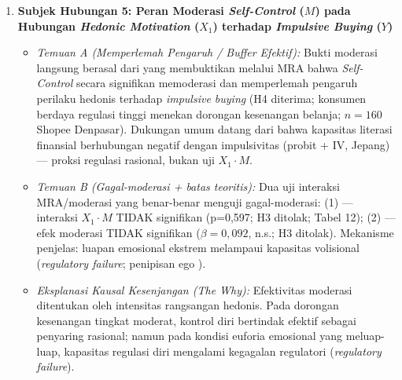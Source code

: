 \documentclass[12pt,a4paper]{article}
\numberwithin{equation}{section}
\numberwithin{table}{section}
\numberwithin{figure}{section}
\begin{document}
\begin{enumerate}
  \item \textbf{Subjek Hubungan 5: Peran Moderasi \emph{Self-Control} ($M$) pada Hubungan \emph{Hedonic Motivation} ($X_1$) terhadap \emph{Impulsive Buying} ($Y$)}
  \begin{itemize}
    \item \emph{Temuan A (Memperlemah Pengaruh / Buffer Efektif):} Bukti moderasi langsung berasal dari \citet{lienardy2026role} yang membuktikan melalui MRA bahwa \emph{Self-Control} secara signifikan memoderasi dan memperlemah pengaruh perilaku hedonis terhadap \emph{impulsive buying} (H4 diterima; konsumen berdaya regulasi tinggi menekan dorongan kesenangan belanja; $n=160$ Shopee Denpasar). Dukungan umum datang dari \citet{katauke2023financial} bahwa kapasitas literasi finansial berhubungan negatif dengan impulsivitas (probit + IV, Jepang) — proksi regulasi rasional, bukan uji $X_1 \cdot M$.
    \item \emph{Temuan B (Gagal-moderasi + batas teoritis):} Dua uji interaksi MRA/moderasi yang benar-benar menguji gagal-moderasi: (1) \citet{apidana2022peran} — interaksi $X_1 \cdot M$ TIDAK signifikan (p=0,597; H3 ditolak; Tabel 12); (2) \citet{artadita2024how} — efek moderasi TIDAK signifikan ($\beta=0{,}092$, n.s.; H3 ditolak). Mekanisme penjelas: luapan emosional ekstrem melampaui kapasitas volisional (\emph{regulatory failure}; penipisan ego \citep{baumeister2002yield, vohs2007spent}).
    \item \emph{Eksplanasi Kausal Kesenjangan (\emph{The Why}):} Efektivitas moderasi ditentukan oleh intensitas rangsangan hedonis. Pada dorongan kesenangan tingkat moderat, kontrol diri bertindak efektif sebagai penyaring rasional; namun pada kondisi euforia emosional yang meluap-luap, kapasitas regulasi diri mengalami kegagalan regulatori (\emph{regulatory failure}).
  \end{itemize}


\end{enumerate}
\end{document}
